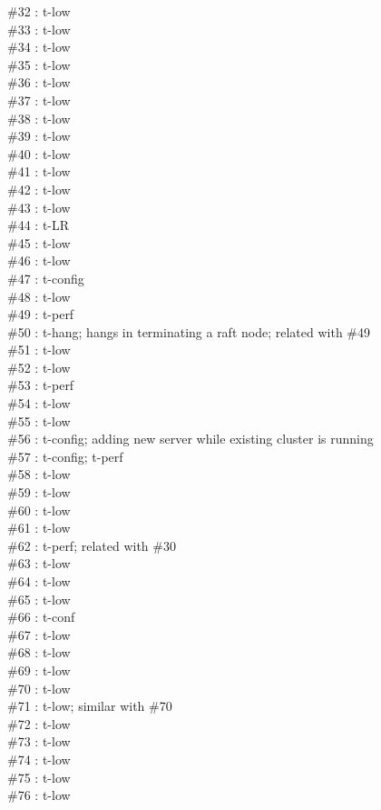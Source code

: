 \#32 : t-low\\
\#33 : t-low\\
\#34 : t-low\\
\#35 : t-low\\
\#36 : t-low\\
\#37 : t-low\\
\#38 : t-low\\
\#39 : t-low\\
\#40 : t-low\\
\#41 : t-low\\
\#42 : t-low\\
\#43 : t-low\\
\#44 : t-LR\\
\#45 : t-low\\
\#46 : t-low\\
\#47 : t-config\\
\#48 : t-low\\
\#49 : t-perf\\
\#50 : t-hang; hangs in terminating a raft node; related with \#49\\
\#51 : t-low\\
\#52 : t-low\\
\#53 : t-perf\\
\#54 : t-low\\
\#55 : t-low\\
\#56 : t-config; adding new server while existing cluster is running\\
\#57 : t-config; t-perf\\
\#58 : t-low\\
\#59 : t-low\\
\#60 : t-low\\
\#61 : t-low\\
\#62 : t-perf; related with \#30\\
\#63 : t-low\\
\#64 : t-low\\
\#65 : t-low\\
\#66 : t-conf\\
\#67 : t-low\\
\#68 : t-low\\
\#69 : t-low\\
\#70 : t-low\\
\#71 : t-low; similar with \#70\\
\#72 : t-low\\
\#73 : t-low\\
\#74 : t-low\\
\#75 : t-low\\
\#76 : t-low\\
